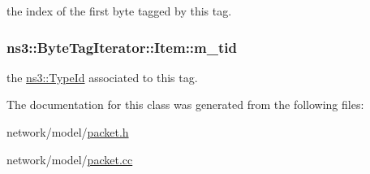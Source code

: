 the index of the first byte tagged by this tag. 

\subsubsection[{\texorpdfstring{m\+\_\+tid}{m_tid}}]{ ns3\+::\+Byte\+Tag\+Iterator\+::\+Item\+::m\+\_\+tid\hspace{0.3cm}{\ttfamily [private]}}\hypertarget{classns3_1_1ByteTagIterator_1_1Item_a010f3251f091813ea786ed2362bb1100}{}\label{classns3_1_1ByteTagIterator_1_1Item_a010f3251f091813ea786ed2362bb1100}


the \hyperlink{classns3_1_1TypeId}{ns3\+::\+Type\+Id} associated to this tag. 



The documentation for this class was generated from the following files\+:\begin{DoxyCompactItemize}
\item 
network/model/\hyperlink{packet_8h}{packet.\+h}\item 
network/model/\hyperlink{packet_8cc}{packet.\+cc}\end{DoxyCompactItemize}
